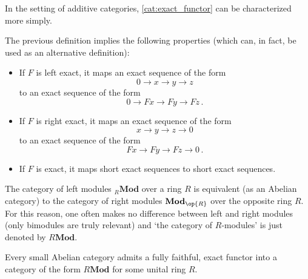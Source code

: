     In the setting of additive categories, \cref{cat:exact_functor} can be characterized more simply.
    \begin{result}
        The previous definition implies the following properties (which can, in fact, be used as an alternative definition):
        \begin{itemize}
            \item If $F$ is left exact, it maps an exact sequence of the form \[0\longrightarrow x\longrightarrow y\longrightarrow z\]
            to an exact sequence of the form \[0\longrightarrow Fx\longrightarrow Fy\longrightarrow Fz\,.\]
            \item If $F$ is right exact, it maps an exact sequence of the form \[x\longrightarrow y\longrightarrow z\longrightarrow 0\]
            to an exact sequence of the form \[Fx\longrightarrow Fy\longrightarrow Fz\longrightarrow 0\,.\]
            \item If $F$ is exact, it maps short exact sequences to short exact sequences.
        \end{itemize}
    \end{result}

    \begin{notation}
        The category of left modules ${}_R\mathbf{Mod}$ over a ring $R$ is equivalent (as an Abelian category) to the category of right modules $\mathbf{Mod}_{\op{R}}$ over the opposite ring $R$. For this reason, one often makes no difference between left and right modules (only bimodules are truly relevant) and `the category of $R$-modules' is just denoted by $R\mathbf{Mod}$.
    \end{notation}

    \begin{theorem}\label{cat:freyd_mitchell}
        Every small Abelian category admits a fully faithful, exact functor into a category of the form $R\mathbf{Mod}$ for some unital ring $R$.
    \end{theorem}


